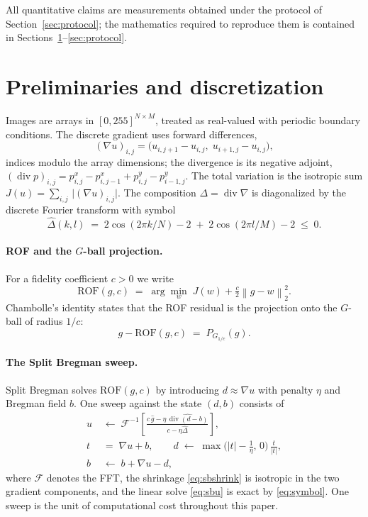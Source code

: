 \documentclass[11pt]{article}
\theoremstyle{definition}
\newcommand{\norm}[1]{\left\lVert #1 \right\rVert}
\newcommand{\ROF}{\mathrm{ROF}}
\newcommand{\dv}{\operatorname{div}}
\begin{document}
All quantitative claims are measurements obtained under the protocol of
Section~\ref{sec:protocol}; the mathematics required to reproduce them is
contained in Sections~\ref{sec:prelim}--\ref{sec:protocol}.

\section{Preliminaries and discretization}
\label{sec:prelim}

Images are arrays in $[0,255]^{N\times M}$, treated as real-valued with
periodic boundary conditions. The discrete gradient uses forward
differences,
\[
(\nabla u)_{i,j} = \bigl(u_{i,j+1}-u_{i,j},\; u_{i+1,j}-u_{i,j}\bigr),
\]
indices modulo the array dimensions; the divergence is its negative
adjoint,
$(\dv p)_{i,j} = p^x_{i,j}-p^x_{i,j-1} + p^y_{i,j}-p^y_{i-1,j}$.
The total variation is the isotropic sum
$J(u)=\sum_{i,j}\,\bigl|(\nabla u)_{i,j}\bigr|$. The composition
$\Delta=\dv\nabla$ is diagonalized by the discrete Fourier transform with
symbol
\begin{equation}
\hat\Delta(k,l) \;=\; 2\cos(2\pi k/N)-2 \;+\; 2\cos(2\pi l/M)-2 \;\le\; 0.
\label{eq:symbol}
\end{equation}

\paragraph{ROF and the $G$-ball projection.}
For a fidelity coefficient $c>0$ we write
\[
\ROF(g,c) \;=\; \arg\min_w\; J(w)+\tfrac{c}{2}\norm{g-w}_2^2 .
\]
Chambolle's identity \cite{chambolle} states that the ROF residual is the
projection onto the $G$-ball of radius $1/c$:
\begin{equation}
g-\ROF(g,c) \;=\; P_{G_{1/c}}(g).
\label{eq:chambolle}
\end{equation}

\paragraph{The Split Bregman sweep.}
Split Bregman \cite{goldstein} solves $\ROF(g,c)$ by introducing
$d\approx\nabla u$ with penalty $\eta$ and Bregman field $b$. One sweep
against the state $(d,b)$ consists of
\begin{align}
u &\;\leftarrow\; \mathcal{F}^{-1}\!\left[
\frac{c\,\hat g - \eta\,\widehat{\dv(d-b)}}{\,c-\eta\hat\Delta\,}\right],
\label{eq:sbu}\\
t &\;=\;\nabla u + b,\qquad
d \;\leftarrow\; \max\bigl(|t|-\tfrac1\eta,\,0\bigr)\,\frac{t}{|t|},
\label{eq:sbshrink}\\
b &\;\leftarrow\; b+\nabla u-d,
\label{eq:sbb}
\end{align}
where $\mathcal F$ denotes the FFT, the shrinkage \eqref{eq:sbshrink} is
isotropic in the two gradient components, and the linear solve
\eqref{eq:sbu} is exact by \eqref{eq:symbol}. One sweep is the unit of
computational cost throughout this paper.
\end{document}
